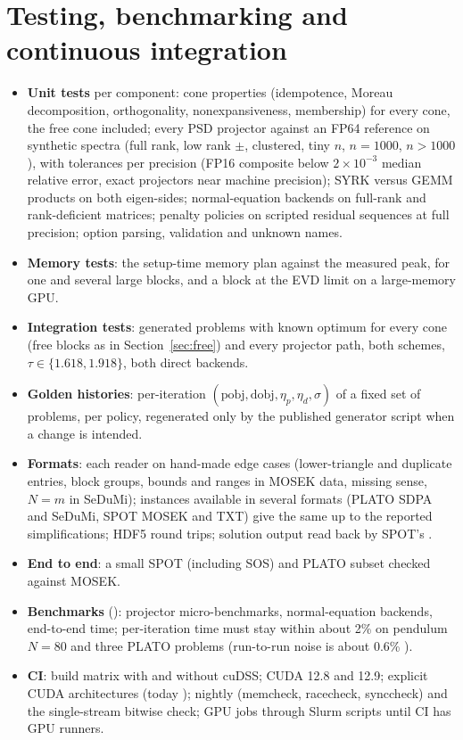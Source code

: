\documentclass[11pt]{article}
\begin{document}
\section{Testing, benchmarking and continuous integration}\label{sec:testing}
\begin{itemize}
  \item \textbf{Unit tests} per component: cone properties (idempotence, Moreau decomposition, orthogonality,
  nonexpansiveness, membership) for every cone, the free cone included; every PSD projector against an FP64
  reference on synthetic spectra (full rank, low rank $\pm$, clustered, tiny $n$, $n=1000$, $n>1000$), with
  tolerances per precision (FP16 composite below $2\times10^{-3}$ median relative error, exact projectors near
  machine precision); SYRK versus GEMM products on both eigen-sides; normal-equation
  backends on full-rank and rank-deficient matrices; penalty policies on scripted residual sequences at full
  precision; option parsing, validation and unknown names.
  \item \textbf{Memory tests}: the setup-time memory plan against the measured peak, for one and several
  large blocks, and a block at the EVD limit on a large-memory GPU.
  \item \textbf{Integration tests}: generated problems with known optimum for every cone (free blocks as in
  Section~\ref{sec:free}) and every projector path, both schemes, $\tau\in\{1.618,1.918\}$, both direct backends.
  \item \textbf{Golden histories}: per-iteration $(\text{pobj},\text{dobj},\eta_p,\eta_d,\sigma)$ of a fixed set
  of problems, per policy, regenerated only by the published generator script when a change is intended.
  \item \textbf{Formats}: each reader on hand-made edge cases (lower-triangle and duplicate entries, block
  groups, bounds and ranges in MOSEK data, missing sense, $N = m$ in SeDuMi); instances available in several
  formats (PLATO SDPA and SeDuMi, SPOT MOSEK and TXT) give the same  up to the reported
  simplifications; HDF5 round trips; solution output read back by SPOT's .
  \item \textbf{End to end}: a small SPOT (including SOS) and PLATO subset checked against MOSEK.
  \item \textbf{Benchmarks} (): projector micro-benchmarks, normal-equation backends, end-to-end
  time; per-iteration time must stay within about 2\% on pendulum $N = 80$ and three PLATO problems
  (run-to-run noise is about 0.6\% \cite{review20}).
  \item \textbf{CI}: build matrix with and without cuDSS; CUDA 12.8 and 12.9; explicit CUDA architectures
  (today ); nightly  (memcheck, racecheck, synccheck) and the
  single-stream bitwise check; GPU jobs through Slurm scripts until CI has GPU runners.
\end{itemize}
\end{document}
